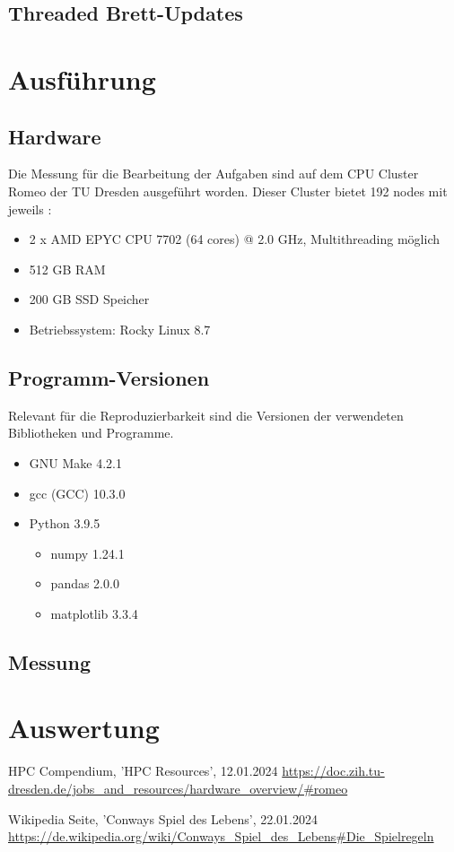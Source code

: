 \documentclass[plainarticle,zihtitle,german,final,hyperref,utf8]{zihpub}
\begin{document}
\subsection{Threaded Brett-Updates}

\section{Ausführung}
\subsection{Hardware}
Die Messung für die Bearbeitung der Aufgaben sind auf dem CPU Cluster Romeo der TU Dresden ausgeführt worden. Dieser Cluster bietet 192 nodes mit jeweils \cite{hpc_compendium}:
\begin{itemize}
	\item 2 x AMD EPYC CPU 7702 (64 cores) @ 2.0 GHz, Multithreading möglich
	\item 512 GB RAM
	\item 200 GB SSD Speicher
	\item Betriebssystem: Rocky Linux 8.7
\end{itemize}

\subsection{Programm-Versionen}
Relevant für die Reproduzierbarkeit sind die Versionen der verwendeten Bibliotheken und Programme.
\begin{itemize}
	\item GNU Make 4.2.1
	\item gcc (GCC) 10.3.0
	\item Python 3.9.5
	\begin{itemize}
		\item numpy 1.24.1
		\item pandas 2.0.0
		\item matplotlib 3.3.4
	\end{itemize}
\end{itemize}

\subsection{Messung}

\section{Auswertung}


\newpage
\begin{thebibliography}{9}
	HPC Compendium, 'HPC Resources', 12.01.2024\newline
	\url{https://doc.zih.tu-dresden.de/jobs_and_resources/hardware_overview/#romeo}
	
	Wikipedia Seite, 'Conways Spiel des Lebens', 22.01.2024\newline
	\url{https://de.wikipedia.org/wiki/Conways_Spiel_des_Lebens#Die_Spielregeln}
\end{thebibliography}
\end{document}
